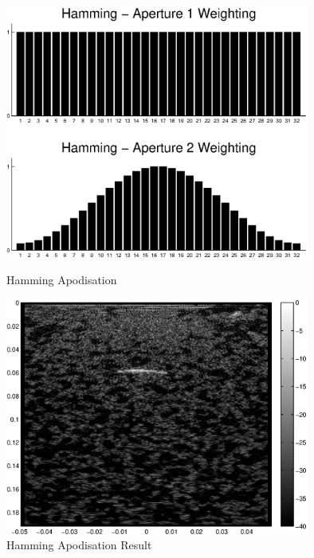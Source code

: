 \begin{figure}[p]
\centering
		\includegraphics[width=100mm]{Hamming.eps}
		\caption{Hamming Apodisation}
		\label{fig:apod_ham}

		\includegraphics[width=100mm]{SAC_Hamming.eps}
		\caption{Hamming Apodisation Result}
		\label{fig:apod_ham_result}
\end{figure}

